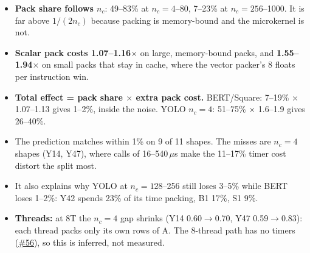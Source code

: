 \documentclass[10pt,a4paper]{article}
\newcommand{\iss}[1]{\href{https://github.com/JieGH/RVV_code_gen_via_MLIR_xDSL/issues/#1}{\##1}}
\begin{document}
\begin{itemize}
  \item \textbf{Pack share follows $n_c$}: 49--83\% at $n_c=4$--80, 7--23\% at $n_c=256$--1000. It is far above $1/(2n_c)$
        because packing is memory-bound and the microkernel is not.
  \item \textbf{Scalar pack costs 1.07--1.16$\times$} on large, memory-bound packs, and \textbf{1.55--1.94$\times$} on small
        packs that stay in cache, where the vector packer's 8 floats per instruction win.
  \item \textbf{Total effect = pack share $\times$ extra pack cost.} BERT/Square: 7--19\% $\times$ 1.07--1.13 gives
        1--2\%, inside the noise. YOLO $n_c=4$: 51--75\% $\times$ 1.6--1.9 gives 26--40\%.
  \item The prediction matches within 1\% on 9 of 11 shapes. The misses are $n_c=4$ shapes (Y14, Y47), where calls of
        16--540\,$\mu$s make the 11--17\% timer cost distort the split most.
  \item It also explains why YOLO at $n_c=128$--256 still loses 3--5\% while BERT loses 1--2\%: Y42 spends 23\% of its
        time packing, B1 17\%, S1 9\%.
  \item \textbf{Threads:} at 8T the $n_c=4$ gap shrinks (Y14 0.60$\to$0.70, Y47 0.59$\to$0.83): each thread packs only
        its own rows of A. The 8-thread path has no timers (\iss{56}), so this is inferred, not measured.
\end{itemize}
\end{document}
